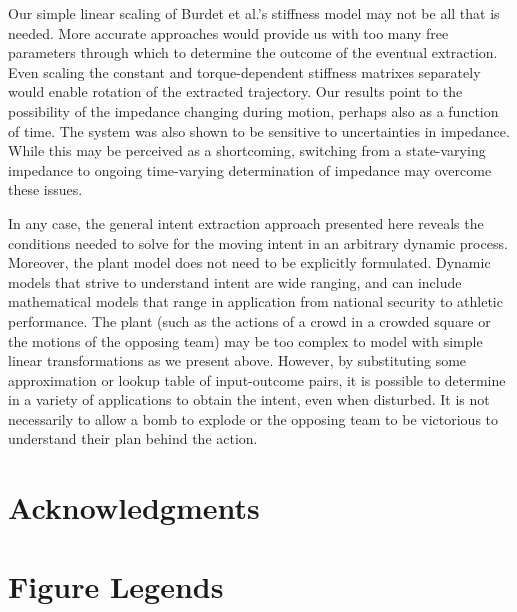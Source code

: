 \documentclass[10pt]{article}
\begin{document}
Our simple linear scaling of Burdet et al.'s stiffness model \cite{burdet2006stability} may not be all that is needed. More accurate approaches would provide us with too many free parameters through which to determine the outcome of the eventual extraction. Even scaling the constant and torque-dependent stiffness matrixes separately would enable rotation of the extracted trajectory. Our results point to the possibility of the impedance changing during motion, perhaps also as a function of time. The system was also shown to be sensitive to uncertainties in impedance. While this may be perceived as a shortcoming, switching from a state-varying impedance to ongoing time-varying determination of impedance may overcome these issues.

In any case, the general intent extraction approach presented here reveals the conditions needed to solve for the moving intent in an arbitrary dynamic process. Moreover, the plant model does not need to be explicitly formulated. Dynamic models that strive to understand intent are wide ranging, and can include mathematical models that range in application from national security to athletic performance. The plant (such as the actions of a crowd in a crowded square or the motions of the opposing team) may be too complex to model with simple linear transformations as we present above. However, by substituting some approximation or lookup table of input-outcome pairs, it is possible to determine in a variety of applications to obtain the intent, even when disturbed. It is not necessarily to allow a bomb to explode or the opposing team to be victorious to understand their plan behind the action.

\section*{Acknowledgments}




\section*{Figure Legends}
\end{document}
